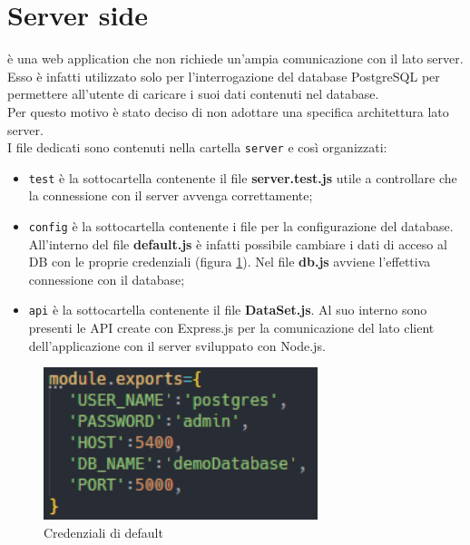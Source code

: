 \section{Server side}
\NomeProgetto{} è una web application che non richiede un'ampia comunicazione con il lato server. Esso è infatti utilizzato solo per l'interrogazione del database PostgreSQL per permettere all'utente di caricare i suoi dati contenuti nel database. \\
Per questo motivo è stato deciso di non adottare una specifica architettura lato server. \\
I file dedicati sono contenuti nella cartella \texttt{server} e così organizzati:
\begin{itemize}
	\item \texttt{test} è la sottocartella contenente il file \textbf{server.test.js} utile a controllare che la connessione con il server avvenga correttamente; 
	\item \texttt{config} è la sottocartella contenente i file per la configurazione del database. All'interno del file \textbf{default.js} è infatti possibile cambiare i dati di acceso al DB con le proprie credenziali (figura \ref{config}).
	Nel file \textbf{db.js} avviene l'effettiva connessione con il database;
	\item \texttt{api} è la sottocartella contenente il file \textbf{DataSet.js}. Al suo interno sono presenti le API create con Express.js per la comunicazione del lato client dell'applicazione con il server sviluppato con Node.js.
\end{itemize}

\begin{figure}[hb]
\includegraphics[width=8cm]{Images/credenziali}
\centering
\caption{Credenziali di default}
\label{config}
\end{figure}